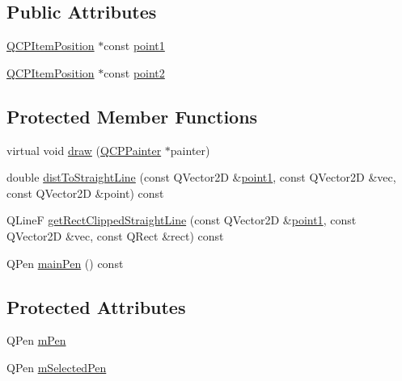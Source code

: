 \subsection*{Public Attributes}
\begin{DoxyCompactItemize}
\item 
\hyperlink{class_q_c_p_item_position}{Q\+C\+P\+Item\+Position} $\ast$const \hyperlink{class_q_c_p_item_straight_line_ac131a6ffe456f2cc7364dce541fe0120}{point1}
\item 
\hyperlink{class_q_c_p_item_position}{Q\+C\+P\+Item\+Position} $\ast$const \hyperlink{class_q_c_p_item_straight_line_ad26c0a732e471f63f75d481dcd48cfc9}{point2}
\end{DoxyCompactItemize}
\subsection*{Protected Member Functions}
\begin{DoxyCompactItemize}
\item 
virtual void \hyperlink{class_q_c_p_item_straight_line_a2daa1e1253216c26565d56a2d5530170}{draw} (\hyperlink{class_q_c_p_painter}{Q\+C\+P\+Painter} $\ast$painter)
\item 
double \hyperlink{class_q_c_p_item_straight_line_adc9b6c5bd33c7f806b748b79dfa25926}{dist\+To\+Straight\+Line} (const Q\+Vector2\+D \&\hyperlink{class_q_c_p_item_straight_line_ac131a6ffe456f2cc7364dce541fe0120}{point1}, const Q\+Vector2\+D \&vec, const Q\+Vector2\+D \&point) const 
\item 
Q\+Line\+F \hyperlink{class_q_c_p_item_straight_line_af18ac29577b5b96fece15b0ffea70177}{get\+Rect\+Clipped\+Straight\+Line} (const Q\+Vector2\+D \&\hyperlink{class_q_c_p_item_straight_line_ac131a6ffe456f2cc7364dce541fe0120}{point1}, const Q\+Vector2\+D \&vec, const Q\+Rect \&rect) const 
\item 
Q\+Pen \hyperlink{class_q_c_p_item_straight_line_a63ef39814c5b560dbb7b13e3fec1d940}{main\+Pen} () const 
\end{DoxyCompactItemize}
\subsection*{Protected Attributes}
\begin{DoxyCompactItemize}
\item 
Q\+Pen \hyperlink{class_q_c_p_item_straight_line_a15106ddc2ebd73ed5c1bc57aa92bee8f}{m\+Pen}
\item 
Q\+Pen \hyperlink{class_q_c_p_item_straight_line_a0307a0d56a018656adbf798bc84c2a4b}{m\+Selected\+Pen}
\end{DoxyCompactItemize}
